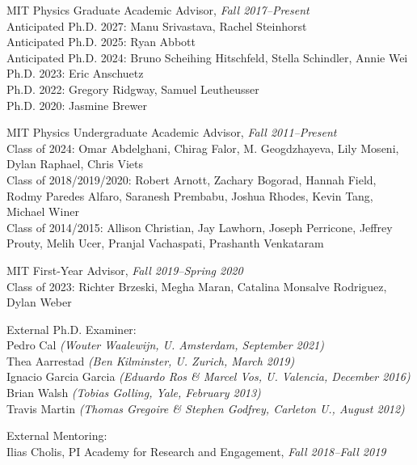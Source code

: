 \item MIT Physics Graduate Academic Advisor, \emph{Fall 2017--Present}
\\ Anticipated Ph.D. 2027: Manu Srivastava, Rachel Steinhorst
\\ Anticipated Ph.D. 2025: Ryan Abbott
\\ Anticipated Ph.D. 2024: Bruno Scheihing Hitschfeld, Stella Schindler, Annie Wei
\\ Ph.D. 2023: Eric Anschuetz
\\ Ph.D. 2022: Gregory Ridgway, Samuel Leutheusser
\\ Ph.D. 2020: Jasmine Brewer
\item MIT Physics Undergraduate Academic Advisor, \emph{Fall 2011--Present}
\\ Class of 2024: Omar Abdelghani, Chirag Falor, M. Geogdzhayeva, Lily Moseni, Dylan Raphael, Chris Viets
\\ Class of 2018/2019/2020: Robert Arnott, Zachary Bogorad, Hannah Field, Rodmy Paredes Alfaro, Saranesh Prembabu, Joshua Rhodes, Kevin Tang, Michael Winer
\\ Class of 2014/2015: Allison Christian, Jay Lawhorn, Joseph Perricone, Jeffrey Prouty, Melih Ucer, Pranjal Vachaspati, Prashanth Venkataram
\item MIT First-Year Advisor, \emph{Fall 2019--Spring 2020}
\\ Class of 2023: Richter Brzeski, Megha Maran, Catalina Monsalve Rodriguez, Dylan Weber

\item External Ph.D. Examiner:
\\ Pedro Cal \textit{(Wouter Waalewijn, U. Amsterdam, September 2021)}
\\ Thea Aarrestad \textit{(Ben Kilminster, U. Zurich, March 2019)}
\\ Ignacio Garcia Garcia \textit{(Eduardo Ros \& Marcel Vos, U. Valencia, December 2016)}
\\ Brian Walsh \textit{(Tobias Golling, Yale, February 2013)}
\\ Travis Martin \textit{(Thomas Gregoire \& Stephen Godfrey, Carleton U., August 2012)}

\item External Mentoring:
\\ Ilias Cholis, PI Academy for Research and Engagement, \emph{Fall 2018--Fall 2019}

\el
